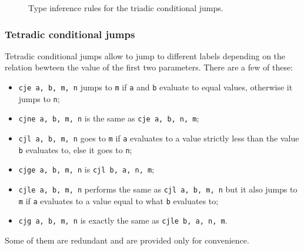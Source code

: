 \begin{figure}[H]
	\centering


	\caption{Type inference rules for the triadic conditional jumps.}
	\label{fig:nstar-instructionset-terminal-cjX-triadic-typerules}
\end{figure}

\subsubsection{Tetradic conditional jumps}\label{subsubsec:nstar-instructionset-terminal-cjX-tetradic}

Tetradic conditional jumps allow to jump to different labels depending on the relation bewteen the value of the first two parameters.
There are a few of these:
\begin{itemize}
	\item \texttt{cje a, b, m, n} jumps to \texttt{m} if \texttt{a} and \texttt{b} evaluate to equal values, otherwise it jumps to \texttt{n};
	\item \texttt{cjne a, b, m, n} is the same as \texttt{cje a, b, n, m};
	\item \texttt{cjl a, b, m, n} goes to \texttt{m} if \texttt{a} evaluates to a value strictly less than the value \texttt{b} evaluates to, else it goes to \texttt{n};
	\item \texttt{cjge a, b, m, n} is \texttt{cjl b, a, n, m};
	\item \texttt{cjle a, b, m, n} performs the same as \texttt{cjl a, b, m, n} but it also jumps to \texttt{m} if \texttt{a} evaluates to a value equal to what \texttt{b} evaluates to;
	\item \texttt{cjg a, b, m, n} is exactly the same as \texttt{cjle b, a, n, m}.
\end{itemize}
Some of them are redundant and are provided only for convenience.

